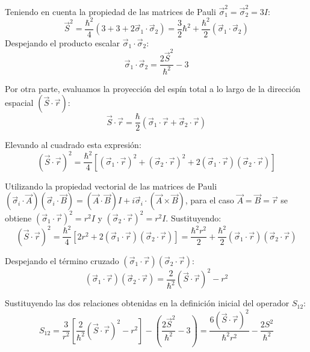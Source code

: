 \begin{problema}
Teniendo en cuenta la propiedad de las matrices de Pauli $\vec{\sigma}_1^2 = \vec{\sigma}_2^2 = 3 I$:
\begin{equation}
\vec{S}^2 = \frac{\hbar^2}{4} \left( 3 + 3 + 2 \vec{\sigma}_1 \cdot \vec{\sigma}_2 \right) = \frac{3}{2}\hbar^2 + \frac{\hbar^2}{2} (\vec{\sigma}_1 \cdot \vec{\sigma}_2)
\end{equation}
Despejando el producto escalar $\vec{\sigma}_1 \cdot \vec{\sigma}_2$:
\begin{equation}
\vec{\sigma}_1 \cdot \vec{\sigma}_2 = \frac{2\vec{S}^2}{\hbar^2} - 3
\end{equation}

Por otra parte, evaluamos la proyección del espín total a lo largo de la dirección espacial $(\vec{S} \cdot \vec{r})$:
\begin{equation}
\vec{S} \cdot \vec{r} = \frac{\hbar}{2} (\vec{\sigma}_1 \cdot \vec{r} + \vec{\sigma}_2 \cdot \vec{r})
\end{equation}

Elevando al cuadrado esta expresión:
\begin{equation}
(\vec{S} \cdot \vec{r})^2 = \frac{\hbar^2}{4} \left[ (\vec{\sigma}_1 \cdot \vec{r})^2 + (\vec{\sigma}_2 \cdot \vec{r})^2 + 2 (\vec{\sigma}_1 \cdot \vec{r})(\vec{\sigma}_2 \cdot \vec{r}) \right]
\end{equation}

Utilizando la propiedad vectorial de las matrices de Pauli $(\vec{\sigma}_i \cdot \vec{A})(\vec{\sigma}_i \cdot \vec{B}) = (\vec{A} \cdot \vec{B}) I + i \vec{\sigma}_i \cdot (\vec{A} \times \vec{B})$, para el caso $\vec{A} = \vec{B} = \vec{r}$ se obtiene $(\vec{\sigma}_1 \cdot \vec{r})^2 = r^2 I$ y $(\vec{\sigma}_2 \cdot \vec{r})^2 = r^2 I$. Sustituyendo:
\begin{equation}
(\vec{S} \cdot \vec{r})^2 = \frac{\hbar^2}{4} \left[ 2r^2 + 2 (\vec{\sigma}_1 \cdot \vec{r})(\vec{\sigma}_2 \cdot \vec{r}) \right] = \frac{\hbar^2 r^2}{2} + \frac{\hbar^2}{2} (\vec{\sigma}_1 \cdot \vec{r})(\vec{\sigma}_2 \cdot \vec{r})
\end{equation}

Despejando el término cruzado $(\vec{\sigma}_1 \cdot \vec{r})(\vec{\sigma}_2 \cdot \vec{r})$:
\begin{equation}
(\vec{\sigma}_1 \cdot \vec{r})(\vec{\sigma}_2 \cdot \vec{r}) = \frac{2}{\hbar^2} (\vec{S} \cdot \vec{r})^2 - r^2
\end{equation}

Sustituyendo las dos relaciones obtenidas en la definición inicial del operador $S_{12}$:
\begin{equation}
S_{12} = \frac{3}{r^2} \left[ \frac{2}{\hbar^2} (\vec{S} \cdot \vec{r})^2 - r^2 \right] - \left( \frac{2\vec{S}^2}{\hbar^2} - 3 \right) = \frac{6(\vec{S} \cdot \vec{r})^2}{\hbar^2 r^2} - \frac{2 S^2}{\hbar^2}
\end{equation}


\end{problema}
